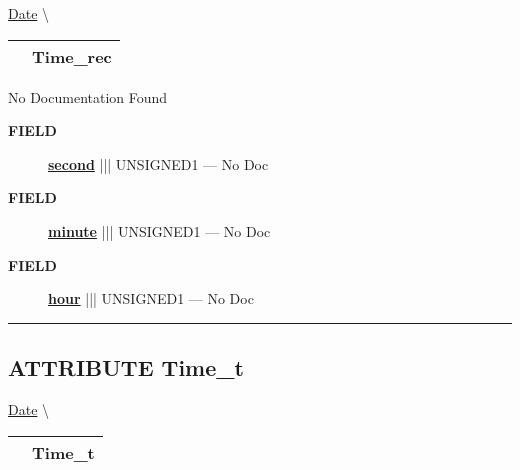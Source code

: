 \hypertarget{ecldoc:date.time_rec}{}
\hspace{0pt} \hyperlink{ecldoc:Date}{Date} \textbackslash 

{\renewcommand{\arraystretch}{1.5}
\begin{tabularx}{\textwidth}{|>{\raggedright\arraybackslash}l|X|}
\hline
\hspace{0pt}\mytexttt{\color{red} } & \textbf{Time\_rec} \\
\hline
\end{tabularx}
}

\par





No Documentation Found







\par
\begin{description}
\item [\colorbox{tagtype}{\color{white} \textbf{\textsf{FIELD}}}] \textbf{\underline{second}} ||| UNSIGNED1 --- No Doc
\item [\colorbox{tagtype}{\color{white} \textbf{\textsf{FIELD}}}] \textbf{\underline{minute}} ||| UNSIGNED1 --- No Doc
\item [\colorbox{tagtype}{\color{white} \textbf{\textsf{FIELD}}}] \textbf{\underline{hour}} ||| UNSIGNED1 --- No Doc
\end{description}





\rule{\linewidth}{0.5pt}
\subsection*{\textsf{\colorbox{headtoc}{\color{white} ATTRIBUTE}
Time\_t}}

\hypertarget{ecldoc:date.time_t}{}
\hspace{0pt} \hyperlink{ecldoc:Date}{Date} \textbackslash 

{\renewcommand{\arraystretch}{1.5}
\begin{tabularx}{\textwidth}{|>{\raggedright\arraybackslash}l|X|}
\hline
\hspace{0pt}\mytexttt{\color{red} } & \textbf{Time\_t} \\
\hline
\end{tabularx}
}

\par





